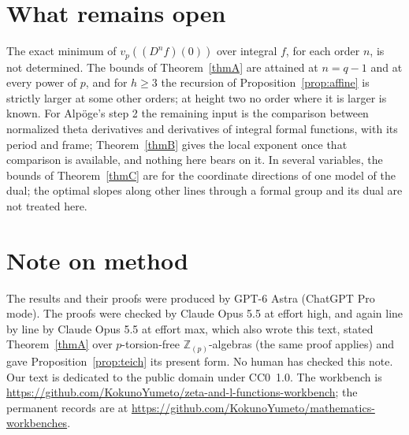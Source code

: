 \documentclass[11pt]{amsart}
\newcommand{\workbenchurl}{https://github.com/KokunoYumeto/zeta-and-l-functions-workbench}
\newcommand{\recordurl}{https://github.com/KokunoYumeto/mathematics-workbenches}
\theoremstyle{definition}
\theoremstyle{remark}
\newcommand{\Z}{\mathbb Z}
\newcommand{\vp}{v_p}
\begin{document}
\section{What remains open}
The exact minimum of $\vp((D^nf)(0))$ over integral $f$, for each order $n$, is not determined. The bounds of Theorem~\ref{thmA} are attained at $n=q-1$ and at every power of $p$, and for $h\ge3$ the recursion of Proposition~\ref{prop:affine} is strictly larger at some other orders; at height two no order where it is larger is known. For Alp\"oge's step 2 the remaining input is the comparison between normalized theta derivatives and derivatives of integral formal functions, with its period and frame; Theorem~\ref{thmB} gives the local exponent once that comparison is available, and nothing here bears on it. In several variables, the bounds of Theorem~\ref{thmC} are for the coordinate directions of one model of the dual; the optimal slopes along other lines through a formal group and its dual are not treated here.

\section*{Note on method}
The results and their proofs were produced by GPT-6 Astra (ChatGPT Pro mode). The proofs were checked by Claude Opus 5.5 at effort high, and again line by line by Claude Opus 5.5 at effort max, which also wrote this text, stated Theorem~\ref{thmA} over $p$-torsion-free $\Z_{(p)}$-algebras (the same proof applies) and gave Proposition~\ref{prop:teich} its present form. No human has checked this note. Our text is dedicated to the public domain under CC0~1.0. The workbench is \expandafter\url\expandafter{\workbenchurl}; the permanent records are at \expandafter\url\expandafter{\recordurl}.
\end{document}

